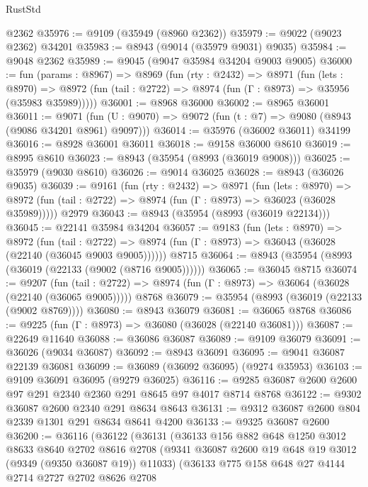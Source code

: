 \begin{lexlean}{RustStd}
\begin{coremodule}
{\begin{coremodule}
{{{{{{{{{{{{{{{{{{{{{{{{{{{{{{{{{{{{{{{    @2362
@35976 := @9109 (@35949 (@8960 @2362))
@35979 := @9022 (@9023 @2362) @34201
@35983 := @8943 (@9014 (@35979 @9031) @9035)
@35984 := @9048 @2362
@35989 := @9045 (@9047 @35984 @34204 @9003 @9005)
@36000 := fun (params : @8967) =>
  @8969
    (fun (rty : @2432) =>
    @8971
      (fun (lets : @8970) =>
      @8972 (fun (tail : @2722) => @8974 (fun (Γ : @8973) => @35956 (@35983 @35989)))))
@36001 := @8968 @36000
@36002 := @8965 @36001
@36011 := @9071
    (fun (U : @9070) => @9072 (fun (t : @7) => @9080 (@8943 (@9086 @34201 @8961) @9097)))
@36014 := @35976 (@36002 @36011) @34199
@36016 := @8928 @36001 @36011
@36018 := @9158 @36000 @8610
@36019 := @8995 @8610
@36023 := @8943 (@35954 (@8993 (@36019 @9008)))
@36025 := @35979 (@9030 @8610)
@36026 := @9014 @36025
@36028 := @8943 (@36026 @9035)
@36039 := @9161
    (fun (rty : @2432) =>
    @8971
      (fun (lets : @8970) =>
      @8972 (fun (tail : @2722) => @8974 (fun (Γ : @8973) => @36023 (@36028 @35989)))))
    @2979
@36043 := @8943 (@35954 (@8993 (@36019 @22134)))
@36045 := @22141 @35984 @34204
@36057 := @9183
    (fun (lets : @8970) =>
    @8972
      (fun (tail : @2722) =>
      @8974 (fun (Γ : @8973) => @36043 (@36028 (@22140 (@36045 @9003 @9005))))))
    @8715
@36064 := @8943 (@35954 (@8993 (@36019 (@22133 (@9002 (@8716 @9005))))))
@36065 := @36045 @8715
@36074 := @9207
    (fun (tail : @2722) => @8974 (fun (Γ : @8973) => @36064 (@36028 (@22140 (@36065 @9005)))))
    @8768
@36079 := @35954 (@8993 (@36019 (@22133 (@9002 @8769))))
@36080 := @8943 @36079
@36081 := @36065 @8768
@36086 := @9225 (fun (Γ : @8973) => @36080 (@36028 (@22140 @36081)))
@36087 := @22649 @11640
@36088 := @36086 @36087
@36089 := @9109 @36079
@36091 := @36026 (@9034 @36087)
@36092 := @8943 @36091
@36095 := @9041 @36087 @22139 @36081
@36099 := @36089 (@36092 @36095) (@9274 @35953)
@36103 := @9109 @36091 @36095 (@9279 @36025)
@36116 := @9285 @36087 @2600 @2600 @97 @291 @2340 @2360 @291 @8645 @97 @4017 @8714 @8768
@36122 := @9302 @36087 @2600 @2340 @291 @8634 @8643
@36131 := @9312 @36087 @2600 @804 @2339 @1301 @291 @8634 @8641 @4200
@36133 := @9325 @36087 @2600
@36200 := @36116
    (@36122
      (@36131
        (@36133
          @156
          @882
          @648
          @1250
          @3012
          @8633
          @8640
          @2702
          @8616
          @2708
          (@9341 @36087 @2600 @19 @648 @19 @3012 (@9349 (@9350 @36087 @19)) @11033)
          (@36133
            @775
            @158
            @648
            @27
            @4144
            @2714
            @2727
            @2702
            @8626
            @2708
}}}}}}}}}}}}}}}}}}}}}}}}}}}}}}}}}}}}}}}
\end{coremodule}}
\end{coremodule}
\end{lexlean}
